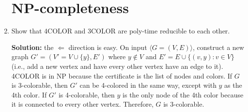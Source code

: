 \documentclass[10pt]{article}
\begin{document}
\begin{enumerate}
\section{NP-completeness}

\item Show that 4COLOR and 3COLOR are poly-time reducible to each other.

\par\textbf{Solution:} the $\Leftarrow$ direction is easy. On input $\langle G = (V, E) \rangle$, construct a new graph $G' = (V' = V \cup \{y\}, E')$ where $y \notin V$ and $E' = E \cup \{(v, y) \colon v \in V\}$ (i.e., add a new vertex and have every other vertex have an edge to it). 4COLOR is in NP because the certificate is the list of nodes and colors. If $G$ is 3-colorable, then $G'$ can be 4-colored in the same way, except with $y$ as the 4th color. If $G'$ is 4-colorable, then $y$ is the only node of the 4th color because it is connected to every other vertex. Therefore, $G$ is 3-colorable.


\end{enumerate}
\end{document}
